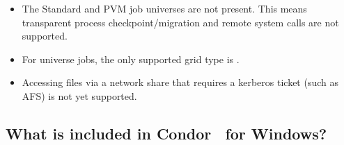 \begin{itemize}

\item The Standard and PVM job universes are not present.  This means
transparent process checkpoint/migration and remote system calls are
not supported.

\item For  universe jobs, the only supported grid type is
.

\item Accessing files via a network share that requires a kerberos ticket
(such as AFS) is not yet supported.

\end{itemize}

\subsection{What is included in Condor \VersionNotice\ for Windows?}

